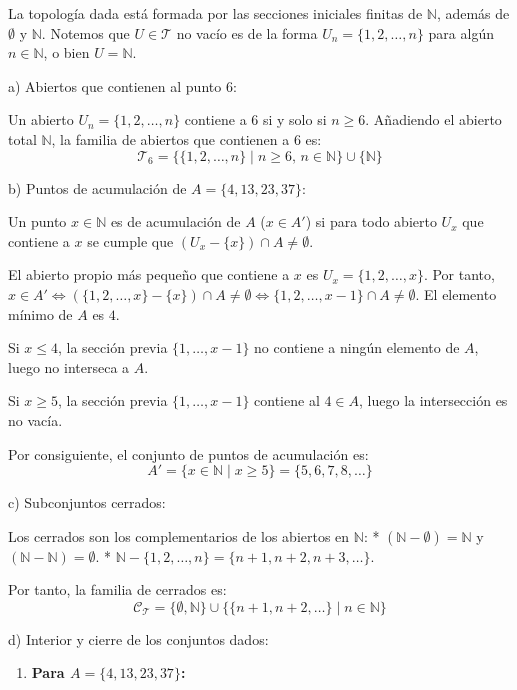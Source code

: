 \begin{sol}
    La topología dada está formada por las secciones iniciales finitas de $\mathbb{N}$, además de $\emptyset$ y $\mathbb{N}$. Notemos que $U \in \mathcal{T}$ no vacío es de la forma $U_n = \{1, 2, \dots, n\}$ para algún $n \in \mathbb{N}$, o bien $U = \mathbb{N}$.

    a) Abiertos que contienen al punto $6$:
    
    Un abierto $U_n = \{1, 2, \dots, n\}$ contiene a $6$ si y solo si $n \geq 6$. Añadiendo el abierto total $\mathbb{N}$, la familia de abiertos que contienen a $6$ es:
    \[
        \mathcal{T}_6 = \{\{1, 2, \dots, n\} \mid n \geq 6, \, n \in \mathbb{N}\} \cup \{\mathbb{N}\}
    \]

    b) Puntos de acumulación de $A = \{4, 13, 23, 37\}$:
    
    Un punto $x \in \mathbb{N}$ es de acumulación de $A$ ($x \in A'$) si para todo abierto $U_x$ que contiene a $x$ se cumple que $(U_x - \{x\}) \cap A \neq \emptyset$.
    
    El abierto propio más pequeño que contiene a $x$ es $U_x = \{1, 2, \dots, x\}$.
    Por tanto, $x \in A' \iff (\{1, 2, \dots, x\} - \{x\}) \cap A \neq \emptyset \iff \{1, 2, \dots, x-1\} \cap A \neq \emptyset$.
    El elemento mínimo de $A$ es $4$. 
      
    Si $x \leq 4$, la sección previa $\{1, \dots, x-1\}$ no contiene a ningún elemento de $A$, luego no interseca a $A$.
    
    Si $x \geq 5$, la sección previa $\{1, \dots, x-1\}$ contiene al $4 \in A$, luego la intersección es no vacía.
    
    Por consiguiente, el conjunto de puntos de acumulación es:
    \[
        A' = \{x \in \mathbb{N} \mid x \geq 5\} = \{5, 6, 7, 8, \dots\}
    \]

    c) Subconjuntos cerrados:
    
    Los cerrados son los complementarios de los abiertos en $\mathbb{N}$:
    * $(\mathbb{N} - \emptyset) = \mathbb{N}$ y $(\mathbb{N} - \mathbb{N}) = \emptyset$.
    * $\mathbb{N} - \{1, 2, \dots, n\} = \{n+1, n+2, n+3, \dots\}$.
    
    Por tanto, la familia de cerrados es:
    \[
        \mathcal{C}_{\mathcal{T}} = \{\emptyset, \mathbb{N}\} \cup \{\{n+1, n+2, \dots\} \mid n \in \mathbb{N}\}
    \]

    d) Interior y cierre de los conjuntos dados:

    \begin{enumerate}[label=\arabic*)]
        \item \textbf{Para $A = \{4, 13, 23, 37\}$:}
        

\end{enumerate}
\end{sol}
